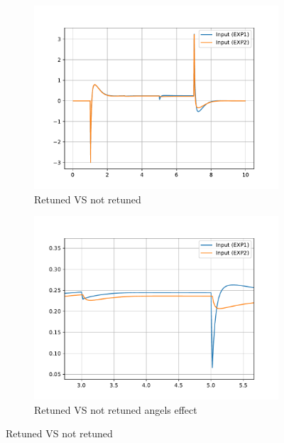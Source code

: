 \begin{figure}[h]
	\centering
	\begin{subfigure}[t]{0.45\textwidth}
		\includegraphics[width=\textwidth]{Retuned VS not retuned}
		\caption{Retuned VS not retuned}
		\label{fig:Retuned VS not retuned}
	\end{subfigure}
	\begin{subfigure}[t]{0.45\textwidth}
		\includegraphics[width=\textwidth]{Retuned VS not retuned angels effect}
		\caption{Retuned VS not retuned angels effect}
		\label{fig:Retuned VS not retuned angels effect}
	\end{subfigure}
	\caption{Retuned VS not retuned}
	\label{fig:Retuned VS not retuned}
\end{figure}
